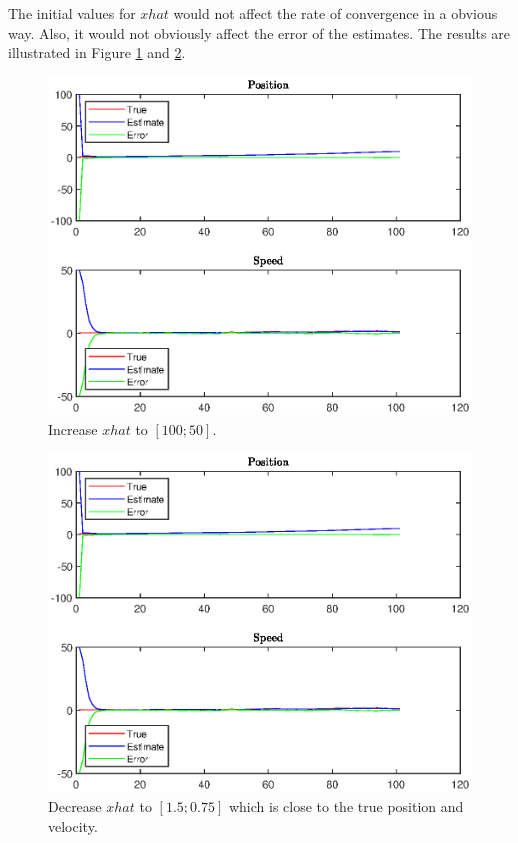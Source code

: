 \documentclass[11pt,a4paper]{article}
\begin{document}
\begin{itemize}
		\par The initial values for $xhat$ would not affect the rate of convergence in a obvious way. Also, it would not obviously affect the error of the estimates. The results are illustrated in Figure \ref{fig:Warmup_xhat_big} and \ref{fig:Warmup_xhat_small}.
		\begin{figure}[H]
			\centering
			\includegraphics[width=0.86\columnwidth]{Warmup_xhat_big.eps}
			\caption{Increase $xhat$ to $[100;50]$.}
			\label{fig:Warmup_xhat_big}
		\end{figure}

		\begin{figure}[H]
			\centering
			\includegraphics[width=0.86\columnwidth]{Warmup_xhat_big.eps}
			\caption{Decrease $xhat$ to $[1.5;0.75]$ which is close to the true position and velocity.}
			\label{fig:Warmup_xhat_small}
		\end{figure}
\end{itemize}
\end{document}
